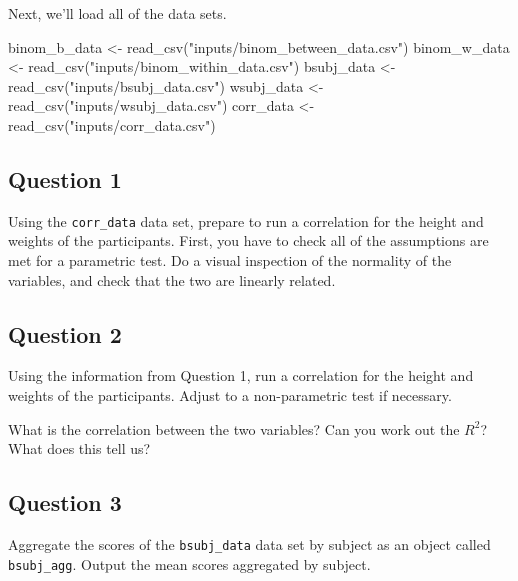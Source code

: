 \documentclass[
]{book}
\newenvironment{Shaded}{\begin{snugshade}}{\end{snugshade}}
\newcommand{\FunctionTok}[1]{\textcolor[rgb]{0.00,0.00,0.00}{#1}}
\newcommand{\NormalTok}[1]{#1}
\newcommand{\OtherTok}[1]{\textcolor[rgb]{0.56,0.35,0.01}{#1}}
\newcommand{\StringTok}[1]{\textcolor[rgb]{0.31,0.60,0.02}{#1}}
\begin{document}
Next, we'll load all of the data sets.

\begin{Shaded}
\begin{Highlighting}[]
\NormalTok{binom\_b\_data }\OtherTok{\textless{}{-}} \FunctionTok{read\_csv}\NormalTok{(}\StringTok{"inputs/binom\_between\_data.csv"}\NormalTok{)}
\NormalTok{binom\_w\_data }\OtherTok{\textless{}{-}} \FunctionTok{read\_csv}\NormalTok{(}\StringTok{"inputs/binom\_within\_data.csv"}\NormalTok{)}
\NormalTok{bsubj\_data }\OtherTok{\textless{}{-}} \FunctionTok{read\_csv}\NormalTok{(}\StringTok{"inputs/bsubj\_data.csv"}\NormalTok{)}
\NormalTok{wsubj\_data }\OtherTok{\textless{}{-}} \FunctionTok{read\_csv}\NormalTok{(}\StringTok{"inputs/wsubj\_data.csv"}\NormalTok{)}
\NormalTok{corr\_data }\OtherTok{\textless{}{-}} \FunctionTok{read\_csv}\NormalTok{(}\StringTok{"inputs/corr\_data.csv"}\NormalTok{)}
\end{Highlighting}
\end{Shaded}

\hypertarget{question-1-5}{%
\subsection{Question 1}\label{question-1-5}}

Using the \texttt{corr\_data} data set, prepare to run a correlation for the height and weights of the participants. First, you have to check all of the assumptions are met for a parametric test. Do a visual inspection of the normality of the variables, and check that the two are linearly related.

\hypertarget{question-2-5}{%
\subsection{Question 2}\label{question-2-5}}

Using the information from Question 1, run a correlation for the height and weights of the participants. Adjust to a non-parametric test if necessary.

What is the correlation between the two variables? Can you work out the \(R^2\)? What does this tell us?

\hypertarget{question-3-5}{%
\subsection{Question 3}\label{question-3-5}}

Aggregate the scores of the \texttt{bsubj\_data} data set by subject as an object called \texttt{bsubj\_agg}. Output the mean scores aggregated by subject.
\end{document}
